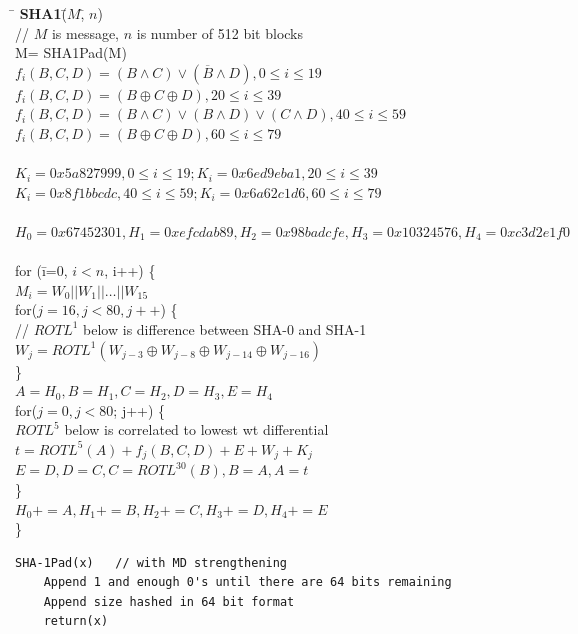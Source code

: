 \begin{tabbing}
\= \kill
{\bf SHA1}\= ($M$,\= $n$)  \=\\
// $M$ is message, $n$ is number of 512 bit blocks \\
    \> M= SHA1Pad(M)  \\
    \> $f_i(B,C,D)= (B \wedge C) \vee ({\overline B} \wedge D), 0 \leq i \leq 19$ \\
    \> $f_i(B,C,D)= (B \oplus C \oplus D), 20 \leq i \leq 39$\\
    \> $f_i(B,C,D)= (B \wedge C) \vee (B \wedge D) \vee (C \wedge D), 40 \leq i \leq 59$ \\
    \> $f_i(B,C,D)= (B \oplus C \oplus D), 60 \leq i \leq 79$\\
    \>\\
    \> $K_i= 0x5a827999, 0 \leq i \leq 19; K_i= 0x6ed9eba1, 20 \leq i \leq 39$\\
    \> $K_i= 0x8f1bbcdc, 40 \leq i \leq 59; K_i= 0x6a62c1d6, 60 \leq i \leq 79$\\
    \>\\
    \> $H_0= 0x67452301, H_1= 0xefcdab89 , H_2= 0x98badcfe , H_3= 0x10324576 ,
	H_4= 0xc3d2e1f0 $\\
    \>\\
    \>for (\=i=0, $i<n$, i++) \{\\
    \>     \> $M_i= W_0 || W_1 || \ldots || W_{15}$\\
    \>     \> for($j=16, j<80, j++$) \{\\
    \>     \>	\> // $ROTL^1$ below is difference between SHA-0 and SHA-1 \\
    \>     \>	\> $W_j= ROTL^1(W_{j-3} \oplus W_{j-8} \oplus W_{j-14} \oplus W_{j-16})$\\
    \>     \>	\> \}\\
    \>     \> $A= H_0, B=H_1, C=H_2, D=H_3, E=H_4$\\
    \>     \> for($j=0, j<80$; j++) \{\\
    \>     \>	\> $ROTL^5$ below is correlated to lowest wt differential \\
    \>     \>	\> $t= ROTL^5(A) + f_j(B,C,D) + E + W_j + K_j$\\
    \>     \>	\> $E= D, D=C, C=ROTL^{30}(B), B=A, A=t$\\
    \>     \>	\> \}\\
    \>	   \> $ H_0+= A, H_1+= B, H_2+= C, H_3+= D, H_4+= E $\\
    \>     \>\}
\end{tabbing}
\begin{verbatim}
SHA-1Pad(x)   // with MD strengthening
    Append 1 and enough 0's until there are 64 bits remaining 
    Append size hashed in 64 bit format 
    return(x)
\end{verbatim}
